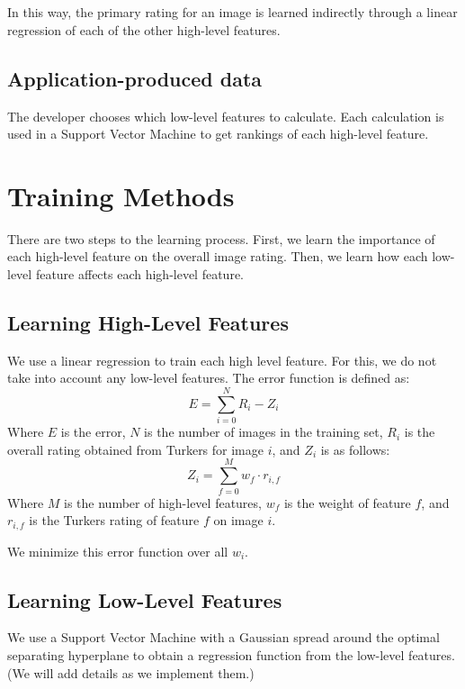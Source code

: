 \documentclass[11pt,letter]{article}
\begin{document}
\\
\\

In this way, the primary rating for an image is learned indirectly through a linear regression of each of the other high-level features.

\subsection{Application-produced data}
The developer chooses which low-level features to calculate. Each calculation is used in a Support Vector Machine to get rankings of each high-level feature.

\section{Training Methods}
\label{methods}

There are two steps to the learning process. First, we learn the importance of each high-level feature on the overall image rating. Then, we learn how each low-level feature affects each high-level feature.


\subsection{Learning High-Level Features}
We use a linear regression to train each high level feature. For this, we do not take into account any low-level features. The error function is defined as:
\[
E=\displaystyle\sum\limits_{i=0}^N R_i-Z_i
\]
Where $E$ is the error, $N$ is the number of images in the training set, $R_i$ is the overall rating obtained from Turkers for image $i$, and $Z_i$ is as follows:
\[
Z_i=\displaystyle\sum\limits_{f=0}^M w_f \cdot r_{i,f}
\]
Where $M$ is the number of high-level features, $w_f$ is the weight of feature $f$, and $r_{i,f}$ is the Turkers rating of feature $f$ on image $i$.

We minimize this error function over all $w_i$.

\subsection{Learning Low-Level Features}
We use a Support Vector Machine with a Gaussian spread around the optimal separating hyperplane to obtain a regression function from the low-level features. (We will add details as we implement them.)
\end{document}
